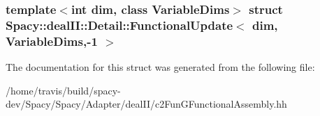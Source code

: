 \subsubsection*{template$<$int dim, class Variable\-Dims$>$ struct Spacy\-::deal\-I\-I\-::\-Detail\-::\-Functional\-Update$<$ dim, Variable\-Dims,-\/1 $>$}



\-The documentation for this struct was generated from the following file\-:\begin{DoxyCompactItemize}
\item 
/home/travis/build/spacy-\/dev/\-Spacy/\-Spacy/\-Adapter/deal\-I\-I/c2\-Fun\-G\-Functional\-Assembly.\-hh\end{DoxyCompactItemize}

